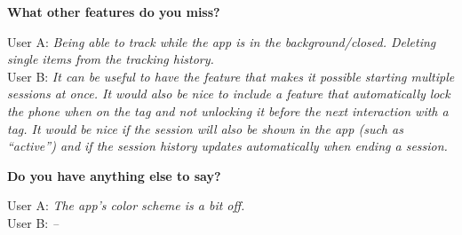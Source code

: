 \documentclass[conference]{IEEEtran}
\newcommand{\surveyquestion}[3]{%
	\noindent\textbf{#1}
	
	\noindent User A: \textit{#2}\\
	User B: \textit{#3}
}
\begin{document}
\surveyquestion{What other features do you miss?}{
	Being able to track while the app is in the background/closed. Deleting single items from the tracking history.
}{
	It can be useful to have the feature that makes it possible starting multiple sessions at once. It would also be nice to include a feature that automatically lock the phone when on the tag and not unlocking it before the next interaction with a tag. It would be nice if the session will also be shown in the app (such as “active”) and if the session history updates automatically when ending a session.
}

\surveyquestion{Do you have anything else to say?}{
	The app's color scheme is a bit off.
}{
	--
}
\end{document}
